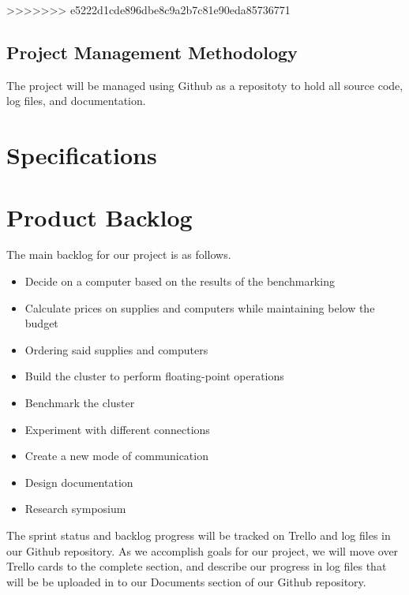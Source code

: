 >>>>>>> e5222d1cde896dbe8c9a2b7c81e90eda85736771
\subsection{Project  Management Methodology}

The project will be managed using Github as a repositoty to hold all source code, log files, and documentation. 


\section{Specifications}

\section{Product Backlog}

The main backlog for our project is as follows.

\begin{itemize}
	\item Decide on a computer based on the results of the benchmarking
	\item Calculate prices on supplies and computers while maintaining below the budget
	\item Ordering said supplies and computers
	\item Build the cluster to perform floating-point operations
	\item Benchmark the cluster
	\item Experiment with different connections
	\item Create a new mode of communication
	\item Design documentation
	\item Research symposium
\end{itemize}

The sprint status and backlog progress will be tracked on Trello and log files in our Github repository. As we accomplish goals for our project, we will move over Trello cards to the complete section, and describe our progress in log files that will be be uploaded in to our Documents section of our Github repository.

